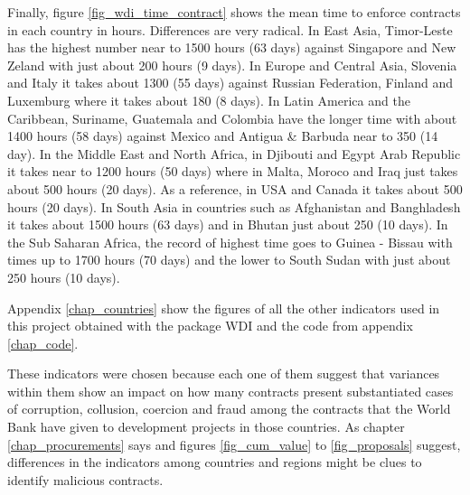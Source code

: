 Finally, figure \ref{fig_wdi_time_contract} shows the mean time to enforce contracts in each country in hours. Differences are very radical. 
 In  East Asia, Timor-Leste has the highest number near to 1500 hours (63 days) against Singapore and New Zeland with just about 200 hours (9 days). In Europe and Central Asia, Slovenia and Italy it takes about 1300 (55 days) against Russian Federation, Finland and Luxemburg where it takes about 180 (8 days). In Latin America and the Caribbean, Suriname, Guatemala and Colombia have the longer time with about 1400 hours (58 days) against Mexico and Antigua \& Barbuda near to 350 (14 day). In the Middle East and North Africa,  in Djibouti and Egypt Arab Republic it takes near to 1200 hours (50 days) where in Malta, Moroco and Iraq just takes about 500 hours (20 days). As a reference, in USA and Canada it takes about 500 hours (20 days). In South Asia in countries such as Afghanistan and Banghladesh it takes about 1500 hours (63 days) and in Bhutan just about 250 (10 days). In the Sub Saharan Africa, the record of highest time goes to Guinea - Bissau with times up to 1700 hours (70 days) and the lower to South Sudan with just about 250 hours (10 days).

 Appendix \ref{chap_countries} show the figures of all the other indicators used in this project obtained with the package WDI\parencite{wb_r} and the code from appendix \ref{chap_code}.

 These indicators were chosen because each one of them suggest that variances within them show an impact on how many contracts present substantiated cases of corruption, collusion, coercion and fraud among the contracts that the World Bank have given to development projects in those countries. As chapter \ref{chap_procurements} says and figures \ref{fig_cum_value} to \ref{fig_proposals}  suggest, differences in the indicators among countries and regions might be clues to identify malicious contracts. 


